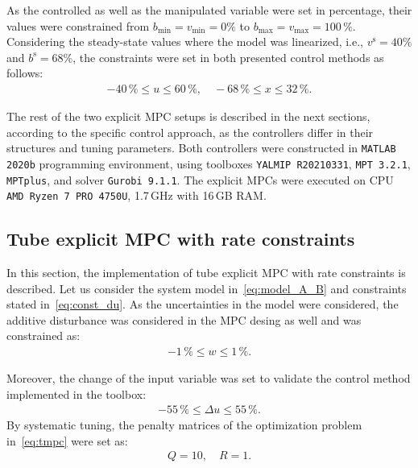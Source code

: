 \documentclass[letterpaper, 10 pt, conference]{ieeeconf}
\begin{document}
As the controlled as well as the manipulated variable were set in percentage, their values were constrained from $b_{\min} = v_{\min} = 0\%$ to $b_{\max} = v_{\max} = 100\,\%$. Considering the steady-state values where the model was linearized, i.e., $ v^\mathrm{s} = 40\%$ and $ b^\mathrm{s} = 68\%$, the constraints were set in both presented control methods as follows: 
\begin{eqnarray}
\label{eq:const_u_y}
	-40\,\% \le u \le 60\,\%, \quad -68\,\% \le x \le 32\,\%.
\end{eqnarray}


The rest of the two explicit MPC setups is described in the next sections, according to the specific control approach, as the controllers differ in their structures and tuning parameters. Both controllers were constructed in \texttt{MATLAB 2020b} programming environment, using toolboxes \texttt{YALMIP R20210331}, \texttt{MPT 3.2.1}, \texttt{MPTplus},
and solver \texttt{Gurobi 9.1.1}. The explicit MPCs were executed on
CPU \texttt{AMD Ryzen 7 PRO 4750U}, 1.7\,GHz with 16\,GB RAM.

\subsection{Tube explicit MPC with rate constraints}
\label{sec:tube_exp}

In this section, the implementation of tube explicit MPC with rate constraints is described. Let us consider the system model in~\eqref{eq:model_A_B} and constraints stated in~\eqref{eq:const_du}. 
As the uncertainties in the model were considered, the additive disturbance was considered in the MPC desing as well and was constrained as:
\begin{eqnarray}
	\label{eq:const_w}
	-1\,\% \le w \le 1\,\%.
\end{eqnarray}

Moreover, the change of the input variable was set to validate the control method implemented in the toolbox:
\begin{eqnarray}
	\label{eq:const_du}
	-55\,\% \le \Delta u \le 55\,\%.
\end{eqnarray}
By systematic tuning, the penalty matrices of the optimization problem in~\eqref{eq:tmpc} were set as:
\begin{eqnarray}
\label{eq:setup_penalty}
Q = 10, \quad R = 1.
\end{eqnarray}
\end{document}
